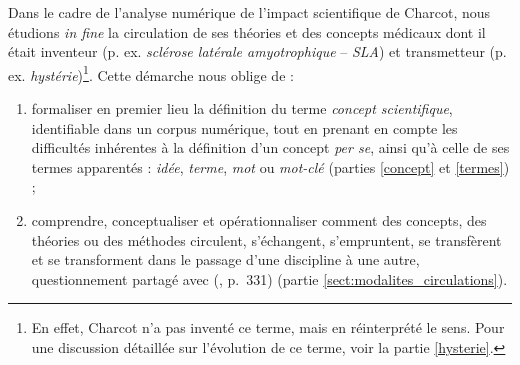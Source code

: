 

Dans le cadre de l'analyse numérique de l'impact scientifique de Charcot, nous étudions \textit{in fine} la circulation de ses théories et des concepts médicaux dont il était inventeur (p. ex. \textit{sclérose latérale amyotrophique} -- \textit{SLA}) et transmetteur (p. ex. \textit{hystérie})\footnote{En effet, Charcot n'a pas inventé ce terme, mais en réinterprété le sens. Pour une discussion détaillée sur l'évolution de ce terme, voir la partie \ref{hysterie}.}. Cette démarche nous oblige de :
\begin{enumerate}
	\item formaliser en premier lieu la définition du terme \textit{concept scientifique}, identifiable dans un corpus numérique, tout en prenant en compte les difficultés inhérentes à la définition d'un concept \textit{per se}, ainsi qu'à celle de ses termes apparentés : \textit{idée}, \textit{terme}, \textit{mot} ou \textit{mot-clé} (parties \ref{concept} et \ref{termes}) ;
	\item comprendre, conceptualiser et opérationnaliser \og{}comment des concepts, des théories ou des méthodes circulent, s'échangent, s'empruntent, se transfèrent et se transforment dans le passage d'une discipline à une autre\fg{}, questionnement partagé avec \citeauthor{landais2014frederic} (\citeyear{landais2014frederic}, p.~331) (partie \ref{sect:modalites_circulations}).
\end{enumerate}

